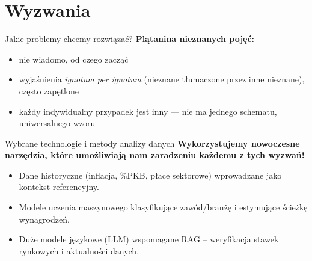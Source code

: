 \section{Wyzwania}

\begin{frame}[t]{Jakie problemy chcemy rozwiązać?}
\textbf{Plątanina nieznanych pojęć:}
    \pause
\begin{itemize}
    \item nie wiadomo, od czego zacząć
    \pause
    \item wyjaśnienia \emph{ignotum per ignotum} (nieznane tłumaczone przez inne nieznane), często zapętlone
    \pause
    \item każdy indywidualny przypadek jest inny --- nie ma jednego schematu, uniwersalnego wzoru
\end{itemize}
\end{frame}

\begin{frame}[t]{Wybrane technologie i metody analizy danych}
\textbf{Wykorzystujemy nowoczesne narzędzia, które umożliwiają nam zaradzeniu każdemu z tych wyzwań!}
    \pause
\begin{itemize}
  \item Dane historyczne (inflacja, \%PKB, płace sektorowe) wprowadzane jako kontekst referencyjny.
  \pause
  \item Modele uczenia maszynowego klasyfikujące zawód/branżę i estymujące ścieżkę wynagrodzeń.
  \pause
  \item Duże modele językowe (LLM) wspomagane RAG – weryfikacja stawek rynkowych i aktualności danych.
\end{itemize}
\end{frame}
